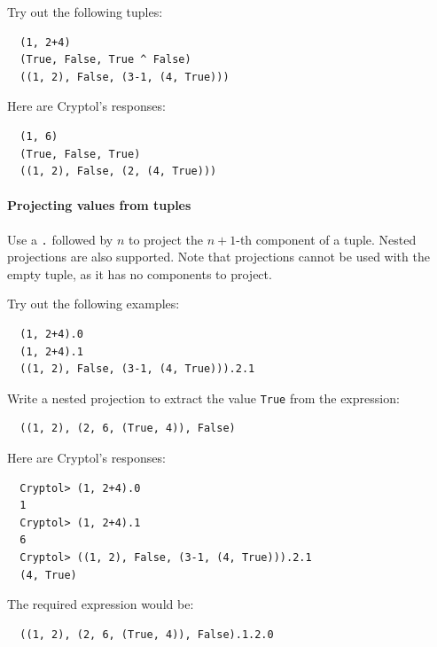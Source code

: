 \begin{Exercise}\label{ex:tup:1}
Try out the following tuples:
\begin{Verbatim}
  (1, 2+4)
  (True, False, True ^ False)
  ((1, 2), False, (3-1, (4, True)))
\end{Verbatim}
\end{Exercise}
\begin{Answer}
Here are Cryptol's responses:
\begin{Verbatim}
  (1, 6)
  (True, False, True)
  ((1, 2), False, (2, (4, True)))
\end{Verbatim}
\end{Answer}


\paragraph*{Projecting values from tuples} Use a \texttt{.} followed by
$n$ to project the $n+1$-th component of a tuple. Nested projections
are also supported. Note that projections cannot be used with the
empty tuple, as it has no components to project.

\begin{Exercise}\label{ex:tup:2}
Try out the following examples:
\begin{Verbatim}
  (1, 2+4).0
  (1, 2+4).1
  ((1, 2), False, (3-1, (4, True))).2.1
\end{Verbatim}
Write a nested projection to extract the value \texttt{True} from the
expression:
\begin{Verbatim}
  ((1, 2), (2, 6, (True, 4)), False)
\end{Verbatim}
\end{Exercise}
\begin{Answer}
Here are Cryptol's responses:
\begin{Verbatim}
  Cryptol> (1, 2+4).0
  1
  Cryptol> (1, 2+4).1
  6
  Cryptol> ((1, 2), False, (3-1, (4, True))).2.1
  (4, True)
\end{Verbatim}
The required expression would be:
\begin{Verbatim}
  ((1, 2), (2, 6, (True, 4)), False).1.2.0
\end{Verbatim}
\end{Answer}

